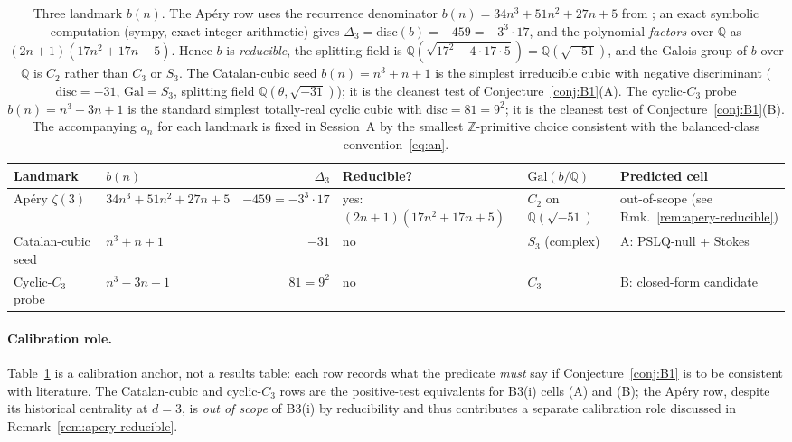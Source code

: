 \documentclass[11pt,a4paper]{article}
\theoremstyle{definition}
\theoremstyle{remark}
\newcommand{\Q}{\mathbb{Q}}
\newcommand{\Z}{\mathbb{Z}}
\newcommand{\disc}{\mathrm{disc}}
\newcommand{\Gal}{\mathrm{Gal}}
\begin{document}
\begin{table}[h]
\centering
\small
\begin{tabular}{p{}p{}rp{}p{}p{}}
\toprule
Landmark & $b(n)$ & $\Delta_{3}$ & Reducible? & $\Gal(b/\Q)$ & Predicted cell \\
\midrule
Ap\'ery $\zeta(3)$ & $34n^{3}+51n^{2}+27n+5$ & $-459=-3^{3}\cdot 17$ & yes: $(2n+1)(17n^{2}+17n+5)$ & $C_{2}$ on $\Q(\sqrt{-51})$ & out-of-scope (see Rmk.~\ref{rem:apery-reducible}) \\
Catalan-cubic seed & $n^{3}+n+1$ & $-31$ & no & $S_{3}$ (complex) & A: PSLQ-null + Stokes \\
Cyclic-$C_{3}$ probe & $n^{3}-3n+1$ & $81=9^{2}$ & no & $C_{3}$ & B: closed-form candidate \\
\bottomrule
\end{tabular}
\caption{Three landmark $b(n)$. The Ap\'ery row uses the recurrence
denominator $b(n)=34n^{3}+51n^{2}+27n+5$ from
\cite{vanderPoorten1979,Apery1979,Beukers1979}; an exact symbolic
computation (sympy, exact integer arithmetic) gives
$\Delta_{3}=\disc(b)=-459=-3^{3}\cdot 17$, and the polynomial
\emph{factors} over $\Q$ as $(2n+1)(17n^{2}+17n+5)$. Hence $b$ is
\emph{reducible}, the splitting field is
$\Q(\sqrt{17^{2}-4\cdot 17\cdot 5})=\Q(\sqrt{-51})$, and the Galois
group of $b$ over $\Q$ is $C_{2}$ rather than $C_{3}$ or $S_{3}$. The
Catalan-cubic seed $b(n)=n^{3}+n+1$ is the simplest irreducible cubic
with negative discriminant ($\disc=-31$, $\Gal=S_{3}$, splitting field
$\Q(\theta,\sqrt{-31})$); it is the cleanest test of
Conjecture~\ref{conj:B1}(A). The cyclic-$C_{3}$ probe $b(n)=n^{3}-3n+1$
is the standard simplest totally-real cyclic cubic with
$\disc=81=9^{2}$; it is the cleanest test of
Conjecture~\ref{conj:B1}(B). The accompanying $a_{n}$ for each landmark
is fixed in Session~A by the smallest $\Z$-primitive choice consistent
with the balanced-class convention~\eqref{eq:an}.}
\label{tab:landmarks}
\end{table}

\paragraph{Calibration role.}
Table~\ref{tab:landmarks} is a calibration anchor, not a results table:
each row records what the predicate \emph{must} say if Conjecture~\ref{conj:B1}
is to be consistent with literature. The Catalan-cubic and cyclic-$C_{3}$
rows are the positive-test equivalents for B3(i) cells (A) and (B); the
Ap\'ery row, despite its historical centrality at $d=3$, is
\emph{out of scope} of B3(i) by reducibility and thus contributes a
separate calibration role discussed in Remark~\ref{rem:apery-reducible}.
\end{document}
